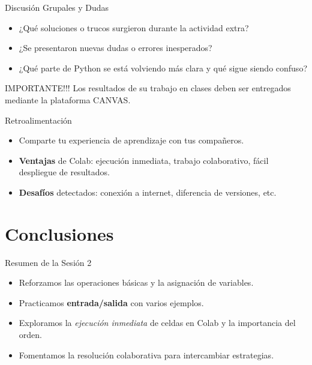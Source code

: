 \documentclass[10pt]{beamer}
\begin{document}
\begin{frame}{Discusión Grupales y Dudas}
  \begin{itemize}
    \item ¿Qué soluciones o trucos surgieron durante la actividad extra?
    \item ¿Se presentaron nuevas dudas o errores inesperados?
    \item ¿Qué parte de Python se está volviendo más clara y qué sigue siendo confuso?
  \end{itemize}
  \begin{block}{IMPORTANTE!!!}
    Los resultados de su trabajo en clases deben ser entregados mediante la plataforma CANVAS.
  \end{block}
\end{frame}

\begin{frame}{Retroalimentación}
  \begin{itemize}
    \item Comparte tu experiencia de aprendizaje con tus compañeros.
    \item \textbf{Ventajas} de Colab: ejecución inmediata, trabajo colaborativo, fácil despliegue de resultados.
    \item \textbf{Desafíos} detectados: conexión a internet, diferencia de versiones, etc.
  \end{itemize}
\end{frame}

\section{Conclusiones}

\begin{frame}{Resumen de la Sesión 2}
  \begin{itemize}
    \item Reforzamos las operaciones básicas y la asignación de variables.
    \item Practicamos \textbf{entrada/salida} con varios ejemplos.
    \item Exploramos la \textit{ejecución inmediata} de celdas en Colab y la importancia del orden.
    \item Fomentamos la resolución colaborativa para intercambiar estrategias.
  \end{itemize}
\end{frame}
\end{document}
